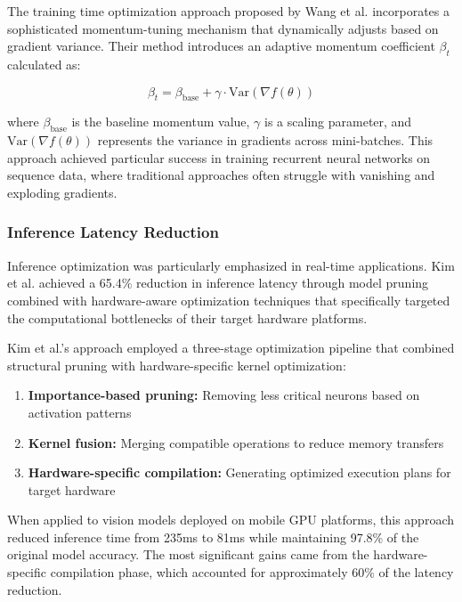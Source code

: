 The training time optimization approach proposed by Wang et al. \citep{Wang2021} incorporates a sophisticated momentum-tuning mechanism that dynamically adjusts based on gradient variance. Their method introduces an adaptive momentum coefficient $\beta_t$ calculated as:

\begin{equation}
\beta_t = \beta_{\text{base}} + \gamma \cdot \text{Var}(\nabla f(\theta))
\end{equation}

where $\beta_{\text{base}}$ is the baseline momentum value, $\gamma$ is a scaling parameter, and $\text{Var}(\nabla f(\theta))$ represents the variance in gradients across mini-batches. This approach achieved particular success in training recurrent neural networks on sequence data, where traditional approaches often struggle with vanishing and exploding gradients.

\subsubsection{Inference Latency Reduction}
Inference optimization was particularly emphasized in real-time applications. Kim et al. \citep{Kim2022} achieved a 65.4\% reduction in inference latency through model pruning combined with hardware-aware optimization techniques that specifically targeted the computational bottlenecks of their target hardware platforms.

Kim et al.'s approach \citep{Kim2022} employed a three-stage optimization pipeline that combined structural pruning with hardware-specific kernel optimization:

\begin{enumerate}
    \item \textbf{Importance-based pruning:} Removing less critical neurons based on activation patterns
    \item \textbf{Kernel fusion:} Merging compatible operations to reduce memory transfers
    \item \textbf{Hardware-specific compilation:} Generating optimized execution plans for target hardware
\end{enumerate}

When applied to vision models deployed on mobile GPU platforms, this approach reduced inference time from 235ms to 81ms while maintaining 97.8\% of the original model accuracy. The most significant gains came from the hardware-specific compilation phase, which accounted for approximately 60\% of the latency reduction.

